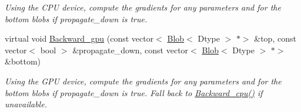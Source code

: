 \begin{DoxyCompactItemize}
\begin{DoxyCompactList}\small\item\em Using the C\+PU device, compute the gradients for any parameters and for the bottom blobs if propagate\+\_\+down is true. \end{DoxyCompactList}\item 
\mbox{\label{classcaffe_1_1_im2col_layer_a7424d962a0a88bb5a44454a836c46f5f}} 
virtual void \mbox{\hyperlink{classcaffe_1_1_im2col_layer_a7424d962a0a88bb5a44454a836c46f5f}{Backward\+\_\+gpu}} (const vector$<$ \mbox{\hyperlink{classcaffe_1_1_blob}{Blob}}$<$ Dtype $>$ $\ast$$>$ \&top, const vector$<$ bool $>$ \&propagate\+\_\+down, const vector$<$ \mbox{\hyperlink{classcaffe_1_1_blob}{Blob}}$<$ Dtype $>$ $\ast$$>$ \&bottom)
\begin{DoxyCompactList}\small\item\em Using the G\+PU device, compute the gradients for any parameters and for the bottom blobs if propagate\+\_\+down is true. Fall back to \mbox{\hyperlink{classcaffe_1_1_im2col_layer_a9c88593258502ae30aeec7be76225b61}{Backward\+\_\+cpu()}} if unavailable. \end{DoxyCompactList}\end{DoxyCompactItemize}
